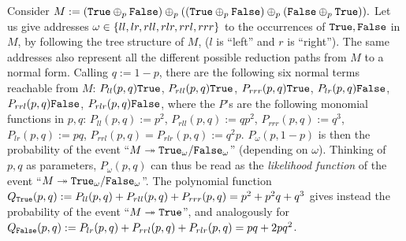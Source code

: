Consider %
$
 M:=(\mathtt{True} \oplus_p\mathtt{False})\oplus_p((\mathtt{True}\oplus_p\mathtt{False})\oplus_p(\mathtt{False}\oplus_p\mathtt{True})).
 $
Let us give addresses $\omega\in\{ll,lr,rll,rlr,rrl,rrr\}$ to the occurrences of $\mathtt{True},\mathtt{False}$ in $M$, by following the tree structure of $M$, ($l$ is ``left'' and $r$ is ``right'').
The same addresses also represent all the different possible reduction paths from $M$ to a normal form.
Calling $q:=1-p$, there are the following six normal terms reachable from $M$:
$P_{ll}(p,q)\mathtt{True}$, 
$P_{rll}(p,q)\mathtt{True}$, 
$P_{rrr}(p,q)\mathtt{True}$, 
$P_{lr}(p,q)\mathtt{False}$, 
$P_{rrl}(p,q)\mathtt{False}$,
$P_{rlr}(p,q)\mathtt{False}$,
where the $P$'s are the following monomial functions in $p,q$:
$P_{ll}(p,q):=p^2$,
$P_{rll}(p,q):=qp^2$,
$P_{rrr}(p,q):=q^3$,
$P_{lr}(p,q):=pq$,
$P_{rrl}(p,q)=P_{rlr}(p,q):=q^2p$.
$P_{\omega}(p,1-p)$ is then the probability of the event ``$M\twoheadrightarrow \mathtt{True}_\omega/\mathtt{False}_\omega$'' (depending on $\omega$).
Thinking of $p,q$ as parameters, $P_{\omega}(p,q)$ can thus be read as the \emph{likelihood function} of the event ``$M\twoheadrightarrow \mathtt{True}_\omega/\mathtt{False}_\omega$''.
The polynomial function $Q_{\mathtt{True}}(p,q):=P_{ll}(p,q)+P_{rll}(p,q)+P_{rrr}(p,q)=p^2+p^2q+q^3$ gives instead the probability of the event ``$M\twoheadrightarrow \mathtt{True}$'', and analogously for $Q_{\mathtt{False}}(p,q):=P_{lr}(p,q)+P_{rrl}(p,q)+P_{rlr}(p,q)=pq+2pq^2$.
